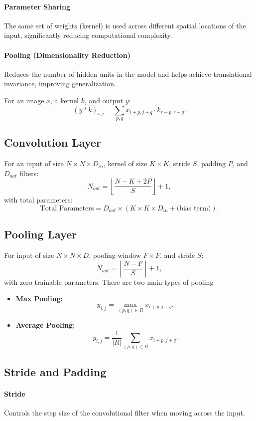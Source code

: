 \documentclass{article}
\begin{document}
\paragraph{Parameter Sharing} The same set of weights (kernel) is used across different spatial locations of the input, significantly reducing computational complexity.
\paragraph{Pooling (Dimensionality Reduction)} Reduces the number of hidden units in the model and helps achieve translational invariance, improving generalization.

For an image \(x\), a kernel \(k\), and output \(y\):
\[
(y * k)_{i,j} = \sum_{p,q} x_{i+p,j+q} \cdot k_{r-p, r-q}.
\]

\subsection{Convolution Layer}
For an input of size \(N \times N \times D_{in}\), kernel of size \(K \times K\), stride \(S\), padding \(P\), and \(D_{out}\) filters:
\[
N_{out} = \left\lfloor \frac{N - K + 2P}{S} \right\rfloor + 1,
\]
with total parameters:
\[
\text{Total Parameters} = D_{out} \times \left( K \times K \times D_{in} + \text{(bias term)} \right).
\]

\subsection{Pooling Layer}
For input of size \(N \times N \times D\), pooling window \(F \times F\), and stride \(S\):
\[
N_{out} = \left\lfloor \frac{N - F}{S} \right\rfloor + 1,
\]
with zero trainable parameters. There are two main types of pooling

\begin{itemize}
    \item \textbf{Max Pooling:}
    \[
    y_{i,j} = \max_{(p,q) \in R} x_{i+p, j+q}.
    \]
    \item \textbf{Average Pooling:}
    \[
    y_{i,j} = \frac{1}{|R|} \sum_{(p,q) \in R} x_{i+p, j+q}.
    \]
\end{itemize}

\subsection{Stride and Padding}
\paragraph{Stride} Controls the step size of the convolutional filter when moving across the input.
\end{document}

